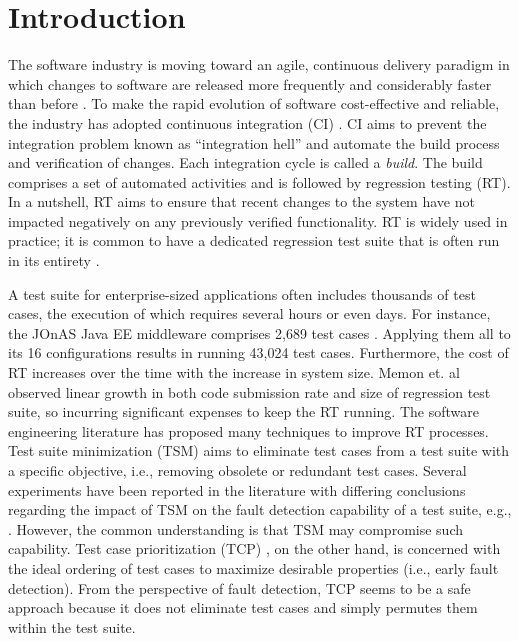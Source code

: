 \documentclass[1p]{elsarticle}
\begin{document}


\section{Introduction}

The software industry is moving toward an agile, continuous delivery paradigm in which changes to software are released more frequently and considerably faster than before \cite{rodriguez2017continuous,mantyla2015rapid}. To make the rapid evolution of software cost-effective and reliable, the industry has adopted continuous integration (CI) \cite{duvall2007continuous}. CI aims to prevent the integration problem known as \enquote{integration hell} and automate the build process and verification of changes. Each integration cycle is called a \textit{build}. The build comprises a set of automated activities and is followed by regression testing (RT). In a nutshell, RT aims to ensure that recent changes to the system have not impacted negatively on any previously verified functionality. RT is widely used in practice; it is common to have a dedicated regression test suite that is often run in its entirety \cite{engstrom2010qualitative}. 

A test suite for enterprise-sized applications often includes thousands of test cases, the execution of which requires several hours or even days. For instance, the JOnAS Java EE middleware comprises 2,689 test cases \cite{kessis2005experiences}. Applying them all to its 16 configurations results in running 43,024 test cases. Furthermore, the cost of RT increases over the time with the increase in system size. Memon et. al \cite{memon2017taming} observed linear growth in both code submission rate and size of regression test suite, so incurring significant expenses to keep the RT running. The software engineering literature has proposed many techniques to improve RT processes. Test suite minimization (TSM) \cite{harrold1993methodology} aims to eliminate test cases from a test suite with a specific objective, i.e., removing obsolete or redundant test cases. Several experiments have been reported in the literature with differing conclusions regarding the impact of TSM on the fault detection capability of a test suite, e.g., \cite{rothermel1998empirical,wong1999test,heimdahl2007effect}. However, the common understanding is that TSM may compromise such capability. Test case prioritization (TCP) \cite{rothermel2001prioritizing}, on the other hand, is concerned with the ideal ordering of test cases to maximize desirable properties (i.e., early fault detection). From the perspective of fault detection, TCP seems to be a safe approach because it does not eliminate test cases and simply permutes them within the test suite. 
\end{document}
